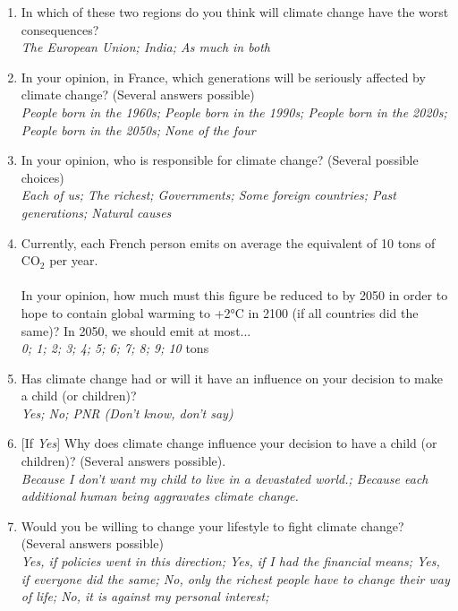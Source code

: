 \documentclass[english,5p,authoryear]{elsarticle}
\begin{document}
\begin{appendices}
\begin{enumerate}[resume,leftmargin=*]
{be able to live with it; Grave, because there would be more natural
disasters; Disastrous, lifestyles would be largely altered; Cataclysmic,
humankind would disappear; PNR(Don't know, don't say) }
\item In which of these two regions do you think will climate change have
the worst consequences? \textit{}\\
\textit{The European Union; India; As much in both }
\item In your opinion, in France, which generations will be seriously affected
by climate change? (Several answers possible) \textit{}\\
\textit{People born in the 1960s; People born in the 1990s; People born
in the 2020s; People born in the 2050s; None of the four }
\item In your opinion, who is responsible for climate change? (Several possible
choices) \textit{}\\
\textit{Each of us; The richest; Governments; Some foreign countries;
Past generations; Natural causes }
\item Currently, each French person emits on average the equivalent of 10
tons of CO$_{2}$ per year. \\
\\
In your opinion, how much must this figure be reduced to by 2050 in
order to hope to contain global warming to +2°C in 2100 (if all countries
did the same)? In 2050, we should emit at most... \textit{}\\
\textit{0; 1; 2; 3; 4; 5; 6; 7; 8; 9; 10} tons 
\item Has climate change had or will it have an influence on your decision
to make a child (or children)?\textit{ }\\
\textit{Yes; No; PNR (Don't know, don't say)}
\item {[}If \textit{Yes}{]} Why does climate change influence your decision
to have a child (or children)? (Several answers possible). \textit{}\\
\textit{Because I don't want my child to live in a devastated world.;
Because each additional human being aggravates climate change.}
\item Would you be willing to change your lifestyle to fight climate change?
(Several answers possible) \textit{}\\
\textit{Yes, if policies went in this direction; Yes, if I had the financial
means; Yes, if everyone did the same; No, only the richest people
have to change their way of life; No, it is against my personal interest;
}
\end{enumerate}
\end{appendices}
\end{document}
